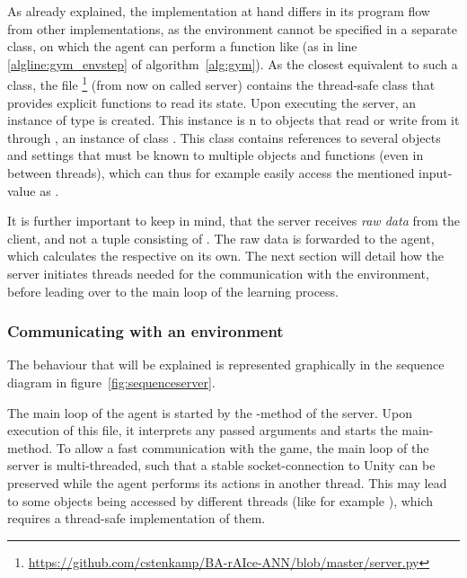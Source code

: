 As already explained, the implementation at hand differs in its program flow from other implementations, as the environment cannot be specified in a separate class, on which the agent can perform a function like  (as in line \ref{algline:gym_envstep} of algorithm~\ref{alg:gym}). As the closest equivalent to such a class, the file  \footnote{\url{https://github.com/cstenkamp/BA-rAIce-ANN/blob/master/server.py}} (from now on called server) contains the thread-safe class  that provides explicit functions to read its state. Upon executing the server, an instance  of type  is created. This instance is n to objects that read or write from it through , an instance of class . This class contains references to several objects and settings that must be known to multiple objects and functions (even in between threads), which can thus for example easily access the mentioned input-value as .

It is further important to keep in mind, that the server receives \textit{raw data} from the client, and not a tuple consisting of . The raw data is forwarded to the agent, which calculates the respective  on its own. The next section will detail how the server initiates threads needed for the communication with the environment, before leading over to the main loop of the learning process.

\subsubsection{Communicating with an environment}

The behaviour that will be explained is represented graphically in the sequence diagram in figure~\ref{fig:sequenceserver}. 

The main loop of the agent is started by the -method of the server. Upon execution of this file, it interprets any passed arguments and starts the main-method. %
To allow a fast communication with the game, the main loop of the server is multi-threaded, such that a stable socket-connection to Unity can be preserved while the agent performs its actions in another thread. This may lead to some objects being accessed by different threads (like for example ), which requires a thread-safe implementation of them.

